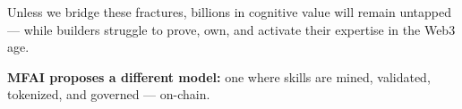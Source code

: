 \vspace{1.5em}

\begin{mfai-warning}
Unless we bridge these fractures, billions in cognitive value will remain untapped — while builders struggle to prove, own, and activate their expertise in the Web3 age.
\end{mfai-warning}

\vspace{1em}

\begin{mfai-note}
\textbf{MFAI proposes a different model:} one where skills are mined, validated, tokenized, and governed — on-chain.
\end{mfai-note}
